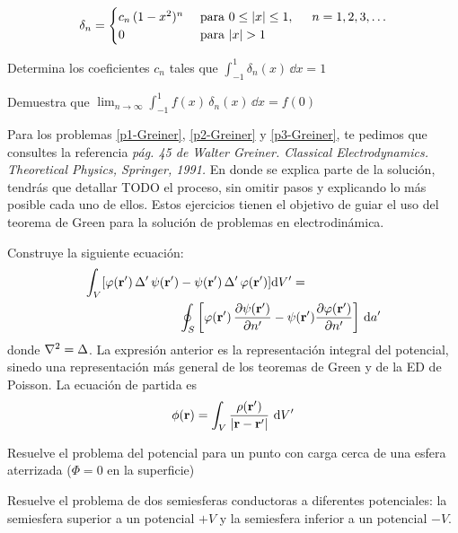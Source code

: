 \begin{milista}
\begin{align*}
\delta_{n} = \begin{cases}
c_{n} \, (1 - x^{2})^{n} & \mbox{ para } 0 \leq \abs{x} \leq 1, \hspace{0.5cm} n = 1, 2, 3, \ldots \\
0 & \mbox{ para } \abs{x} > 1
\end{cases}
\end{align*}
\begin{milista}
\item Determina los coeficientes $c_{n}$ tales que $ \displaystyle \int_{-1}^{1} \delta_{n} (x) \, \dd{x} = 1 $
\item Demuestra que $\displaystyle \lim_{n \to \infty} \int_{-1}^{1} f(x) \, \delta_{n} (x) \, \dd{x} = f(0)$
\end{milista}
Para los problemas \ref{p1-Greiner}, \ref{p2-Greiner} y \ref{p3-Greiner}, te pedimos que consultes la referencia  \textit{pág. 45 de Walter Greiner. Classical Electrodynamics. Theoretical Physics, Springer, 1991.} En donde se explica parte de la solución, tendrás que detallar TODO el proceso, sin omitir pasos y explicando lo más posible cada uno de ellos. Estos ejercicios tienen el objetivo de guiar el uso del teorema de Green para la solución de problemas en electrodinámica.

\item \label{p1-Greiner} Construye la siguiente ecuación:
\begin{align*}
\int_{V} [ \varphi(\vb{r^{\prime}}) \, \Delta^{\prime} \, \psi (\vb{r^{\prime}}) &-  \psi (\vb{r^{\prime}}) \, \Delta^{\prime} \, \varphi (\vb{r^{\prime}})] \dd V^{\prime} = \\
&\oint_{S} \left[ \varphi (\vb{r^\prime}) \, \pdv{\psi (\vb{r^{\prime}})}{n^{\prime}} - \psi (\vb{r^{\prime}}) \pdv{\varphi (\vb{r^{\prime}})}{n^{\prime}} \right] \, \dd a^{\prime}
\end{align*}
donde $\laplacian{} = \Delta$. La expresión anterior es la representación integral del potencial, sinedo una representación más general de los teoremas de Green y de la ED de Poisson. La ecuación de partida es
\begin{align*}
\phi (\vb{r}) = \int_{V} \dfrac{\rho (\vb{r^{\prime}})}{\abs{\vb{r} - \vb{r^{\prime}}}} \, \dd{V^{\prime}}
\end{align*}
\item \label{p2-Greiner} Resuelve el problema del potencial para un punto con carga cerca de una esfera aterrizada ($\Phi = 0$ en la superficie)
\item \label{p3-Greiner} Resuelve el problema de dos semiesferas conductoras a diferentes potenciales: la semiesfera superior a un potencial $+V$ y la semiesfera inferior a un potencial $-V$.
% 
% 
\end{milista}

